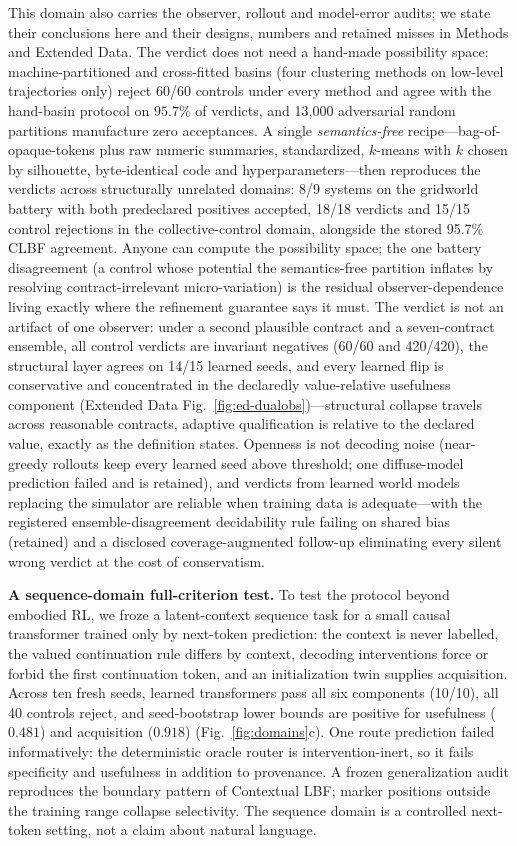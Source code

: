 \documentclass[11pt]{article}
\theoremstyle{definition}
\begin{document}
This domain also carries the observer, rollout and model-error audits;
we state their conclusions here and their designs, numbers and
retained misses in Methods and Extended Data. The verdict does not
need a hand-made possibility space: machine-partitioned and
cross-fitted basins (four clustering methods on low-level trajectories
only) reject 60/60 controls under every method and agree with the
hand-basin protocol on $95.7\%$ of verdicts, and 13,000 adversarial
random partitions manufacture zero acceptances. A single
\emph{semantics-free} recipe---bag-of-opaque-tokens plus raw numeric
summaries, standardized, $k$-means with $k$ chosen by silhouette,
byte-identical code and hyperparameters---then reproduces the verdicts
across structurally unrelated domains: 8/9 systems on the gridworld
battery with both predeclared positives accepted, 18/18 verdicts and
15/15 control rejections in the collective-control domain, alongside
the stored 95.7\% CLBF agreement. Anyone can compute the possibility
space; the one battery disagreement (a control whose potential the
semantics-free partition inflates by resolving contract-irrelevant
micro-variation) is the residual observer-dependence living exactly
where the refinement guarantee says it must. The verdict is not an
artifact of one observer: under a second plausible contract and a
seven-contract ensemble, all control verdicts are invariant negatives
(60/60 and 420/420), the structural layer agrees on 14/15 learned
seeds, and every learned flip is conservative and concentrated in the
declaredly value-relative usefulness component (Extended Data
Fig.~\ref{fig:ed-dualobs})---structural collapse travels across
reasonable contracts, adaptive qualification is relative to the
declared value, exactly as the definition states. Openness is not
decoding noise (near-greedy rollouts keep every learned seed above
threshold; one diffuse-model prediction failed and is retained), and
verdicts from learned world models replacing the simulator are
reliable when training data is adequate---with the registered
ensemble-disagreement decidability rule failing on shared bias
(retained) and a disclosed coverage-augmented follow-up eliminating
every silent wrong verdict at the cost of conservatism.

\textbf{A sequence-domain full-criterion test.}
To test the protocol beyond embodied RL, we froze a latent-context
sequence task for a small causal transformer trained only by
next-token prediction: the context is never labelled, the valued
continuation rule differs by context, decoding interventions force or
forbid the first continuation token, and an initialization twin
supplies acquisition. Across ten fresh seeds, learned transformers
pass all six components (10/10), all 40 controls reject, and
seed-bootstrap lower bounds are positive for usefulness ($0.481$) and
acquisition ($0.918$) (Fig.~\ref{fig:domains}c). One route prediction
failed informatively: the deterministic oracle router is
intervention-inert, so it fails specificity and usefulness in addition
to provenance. A frozen generalization audit reproduces the boundary
pattern of Contextual LBF; marker positions outside the training range
collapse selectivity. The sequence domain is a controlled next-token
setting, not a claim about natural language.
\end{document}
